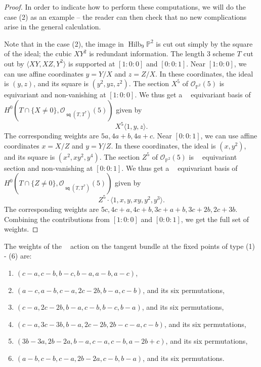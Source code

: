 \documentclass{article}
\renewcommand{\P}{\mathbb{P}}
\DeclareMathOperator{\Hilb}{Hilb}
\renewcommand{\O}{\mathcal{O}}
\DeclareMathOperator{\Gm}{\mathbb{G}_{m}}
\DeclareMathOperator{\s}{\mathsf{sq}}
\begin{document}
\begin{proof}
In order to indicate how to perform these computations, we will do the case 
(2) as an example -- the reader can then check that no new complications arise in the general calculation.  

Note that in the case (2), the image in
$\Hilb_9 \P^2$ is cut out simply by the square of the ideal; the cubic
 $XY^{2}$ is redundant information.  The length $3$ scheme
$T$ cut out by $\langle XY, XZ, Y^2 \rangle$ is supported at $[1:0:0]$
and $[0:0:1]$.  Near $[1:0:0]$, we can use affine coordinates
$y = Y/X$ and $z = Z/X$.  In these coordinates, the ideal is $(y, z)$,
and its square is $(y^2, yz, z^2)$.  The section $X^5$ of
$\O_{\P^2}(5)$ is $\Gm$ equivariant and non-vanishing at $[1:0:0]$.
We thus get a $\Gm$ equivariant basis of
$H^0(T \cap \{X \neq 0\}, \O_{\s(T,T^{*})}(5))$ given by
\[ X^5 \langle 1, y, z \rangle.\] The corresponding weights are
$5a, 4a+b, 4a+c$.  Near $[0:0:1]$, we can use affine coordinates
$x = X/Z$ and $y = Y/Z$.  In these coordinates, the ideal is
$(x, y^2)$, and its square is $(x^2, xy^2, y^4)$.  The section $Z^5$
of $\O_{\P^2}(5)$ is $\Gm$ equivariant section and non-vanishing at
$[0:0:1]$.  We thus get a $\Gm$ equivariant basis of
$H^0(T \cap \{Z \neq 0\} , \O_{\s(T,T^{*})}(5))$ given by
\[ Z^5 \cdot \langle 1, x, y, xy, y^2, y^3 \rangle.\]
The corresponding weights are $5c, 4c+a, 4c+b, 3c+a+b, 3c+2b, 2c+3b$.
Combining the contributions from $[1:0:0]$ and $[0:0:1]$, we get the full set of weights.
\end{proof}

\begin{proposition}
The weights of the $\Gm$ action on the tangent bundle at the
 fixed points of type (1) - (6) are:
\begin{enumerate}
\item $(c-a, c-b, b-c, b-a, a-b, a-c)$,
\item $(a-c, a-b, c-a, 2c-2b, b-a, c-b)$, and its six permutations,
\item $(c-a, 2c-2b, b-a, c-b, b-c, b-a)$, and its six permutations,
\item $(c-a, 3c-3b, b-a, 2c-2b, 2b-c-a, c-b)$, and its six permutations,
\item $(3b-3a, 2b-2a, b-a, c-a, c-b, a-2b+c)$, and its six permutations,
\item $(a-b, c-b, c-a, 2b-2a, c-b, b-a)$, and its six permutations.
\end{enumerate}
\end{proposition}
\end{document}
